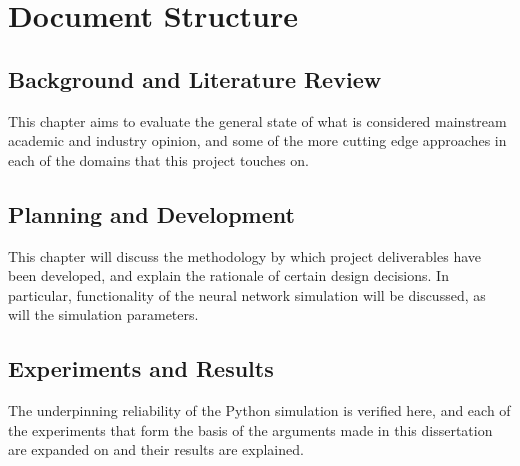 
%

\section{Document Structure}

\subsection*{Background and Literature Review}
This chapter aims to evaluate the general state of what is considered mainstream
academic and industry opinion, and some of the more cutting edge approaches in
each of the domains that this project touches on.

\subsection*{Planning and Development}
This chapter will discuss the methodology by which project deliverables have
been developed, and explain the rationale of certain design decisions. In
particular, functionality of the neural network simulation will be discussed, as
will the simulation parameters.

\subsection*{Experiments and Results}
The underpinning reliability of the Python simulation is verified here, and
each of the experiments that form the basis of the arguments made in this
dissertation are expanded on and their results are explained.

